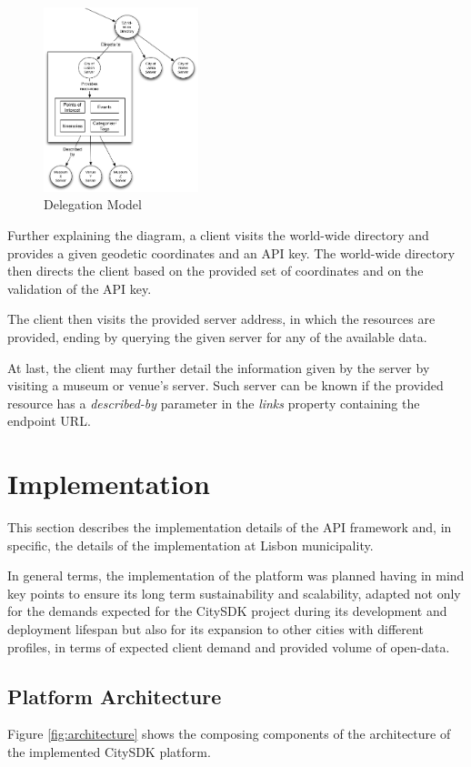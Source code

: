 \documentclass[times,doublespace]{ettauth}%
\begin{document}
\begin{figure}
\centering
\includegraphics[width=0.4\textwidth]{images/delegation}
\caption{Delegation Model}
\label{fig:delegation}
\end{figure}

Further explaining the diagram, a client visits the world-wide directory and provides a given geodetic coordinates and an API key. The world-wide directory then directs the client based on the provided set of  coordinates and on the validation of the API key.

The client then visits the provided server address, in which the resources are provided, ending by querying the given server for any of the available data. 

At last, the client may further detail the information given by the server by visiting a museum or venue's server. Such server can be known if the provided resource has a \textit{described-by} parameter in the \textit{links} property containing the endpoint URL.

\section{Implementation}
\label{s:implementation}
This section describes the implementation details of the API framework and, in specific, the details of the implementation at Lisbon municipality. 

In general terms, the implementation of the platform was planned having in mind key points to ensure its long term sustainability and scalability, adapted not only for the demands expected for the CitySDK project during its development and deployment lifespan but also for its expansion to other cities with different profiles, in terms of expected client demand and provided volume of open-data.

\subsection{Platform Architecture}
Figure \ref{fig:architecture} shows the composing components of the architecture of the implemented CitySDK platform. 
\end{document}
